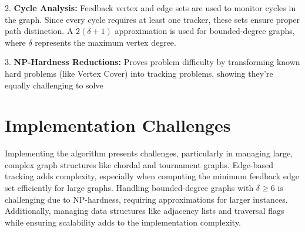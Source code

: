 \documentclass{article}
\begin{document}
2. \textbf{Cycle Analysis:} Feedback vertex and edge sets are used to monitor cycles in the graph. Since every cycle requires at least one tracker, these sets ensure proper path distinction. A $2(\delta+1)$ approximation is used for bounded-degree graphs, where $\delta$ represents the maximum vertex degree.

3. \textbf{NP-Hardness Reductions:} Proves problem difficulty by transforming known hard problems (like Vertex Cover) into tracking problems, showing they're equally challenging to solve

\section*{Implementation Challenges}

Implementing the algorithm presents challenges, particularly in managing large, complex graph structures like chordal and tournament graphs. Edge-based tracking adds complexity, especially when computing the minimum feedback edge set efficiently for large graphs. Handling bounded-degree graphs with $\delta \geq 6$ is challenging due to NP-hardness, requiring approximations for larger instances. Additionally, managing data structures like adjacency lists and traversal flags while ensuring scalability adds to the implementation complexity.
\end{document}
